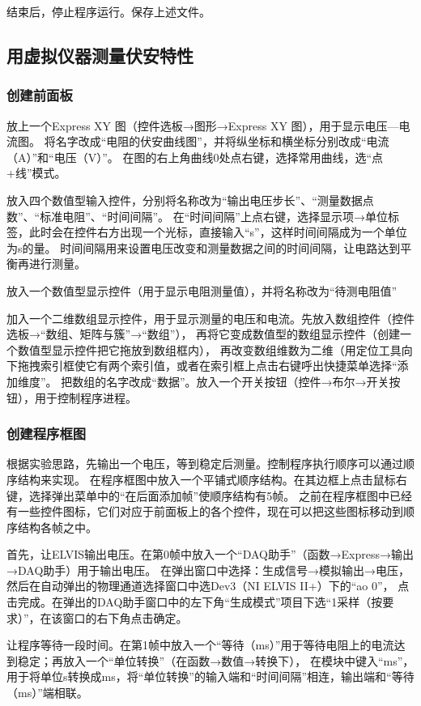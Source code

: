 \documentclass[12pt,a4paper]{article}
\begin{document}
    结束后，停止程序运行。保存上述文件。

    \subsection{用虚拟仪器测量伏安特性}
    \subsubsection{创建前面板}
    放上一个Express XY 图（控件选板→图形→Express XY 图），用于显示电压—电流图。
    将名字改成“电阻的伏安曲线图”，并将纵坐标和横坐标分别改成“电流（A）”和“电压（V）”。
    在图的右上角曲线0处点右键，选择常用曲线，选“点+线”模式。

    放入四个数值型输入控件，分别将名称改为“输出电压步长”、“测量数据点数”、“标准电阻”、“时间间隔”。
    在“时间间隔”上点右键，选择显示项→单位标签，此时会在控件右方出现一个光标，直接输入“s”，这样时间间隔成为一个单位为s的量。
    时间间隔用来设置电压改变和测量数据之间的时间间隔，让电路达到平衡再进行测量。

    放入一个数值型显示控件（用于显示电阻测量值），并将名称改为“待测电阻值”

    加入一个二维数组显示控件，用于显示测量的电压和电流。先放入数组控件（控件选板→“数组、矩阵与簇”→“数组”），
    再将它变成数值型的数组显示控件（创建一个数值型显示控件把它拖放到数组框内），
    再改变数组维数为二维（用定位工具向下拖拽索引框使它有两个索引值，或者在索引框上点击右键呼出快捷菜单选择“添加维度”。
    把数组的名字改成“数据”。放入一个开关按钮（控件→布尔→开关按钮），用于控制程序进程。

    \subsubsection{创建程序框图}
    根据实验思路，先输出一个电压，等到稳定后测量。控制程序执行顺序可以通过顺序结构来实现。
    在程序框图中放入一个平铺式顺序结构。在其边框上点击鼠标右键，选择弹出菜单中的“在后面添加帧”使顺序结构有5帧。
    之前在程序框图中已经有一些控件图标，它们对应于前面板上的各个控件，现在可以把这些图标移动到顺序结构各帧之中。

    首先，让ELVIS输出电压。在第0帧中放入一个“DAQ助手”（函数→Express→输出→DAQ助手）用于输出电压。
    在弹出窗口中选择：生成信号→模拟输出→电压，然后在自动弹出的物理通道选择窗口中选Dev3（NI ELVIS II+）下的“ao 0”，
    点击完成。在弹出的DAQ助手窗口中的左下角“生成模式”项目下选“1采样（按要求）”，在该窗口的右下角点击确定。

    让程序等待一段时间。在第1帧中放入一个“等待（ms）”用于等待电阻上的电流达到稳定；再放入一个“单位转换”（在函数→数值→转换下），
    在模块中键入“ms”，用于将单位s转换成ms，将“单位转换”的输入端和“时间间隔”相连，输出端和“等待（ms）”端相联。
\end{document}
